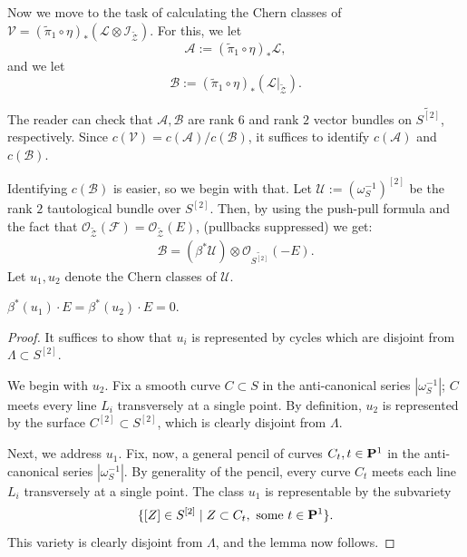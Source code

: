 \documentclass[12pt,reqno]{amsart}
\numberwithin{equation}{section}
\renewcommand{\O}{\mathcal O}
\newcommand{\td}{\widetilde}
\newcommand{\V}{\mathcal V}
\begin{document}
Now we move to the task of calculating the Chern classes of
$\V = (\td{\pi}_{1} \circ \eta)_{*}\left(\mathcal{L} \otimes
  \mathcal{I}_{\td{\mathcal{Z}}}\right)$. For this, we
let \[\mathcal{A} := (\td{\pi}_{1} \circ \eta)_{*}\mathcal{L},\] and
we let \[\mathcal{B} := (\td{\pi}_{1} \circ \eta)_{*} \left(
    \mathcal{L}\big|_{\td{\mathcal{Z}}} \right).\]

The reader can check that $\mathcal{A}, \mathcal{B}$ are rank $6$ and
rank $2$ vector bundles on $\td{S^{[2]}}$, respectively.  Since
$c(\V) = c(\mathcal{A})/c(\mathcal{B})$, it suffices to identify
$c(\mathcal{A})$ and $c(\mathcal{B})$.

Identifying $c(\mathcal{B})$ is easier, so we begin with that. Let
$\mathcal{U} := \left( \omega_{S}^{-1} \right)^{[2]}$ be the rank $2$
tautological bundle over $S^{[2]}$.  Then, by using the push-pull
formula and the fact that
$\O_{\td{\mathcal{Z}}}(\mathcal{F}) = \O_{\td{\mathcal{Z}}}(E)$,
(pullbacks suppressed) we get:
\begin{align}
    \label{eq:B}
    \mathcal{B} = \left(\beta^{*}\mathcal{U} \right) \otimes \O_{\td{S^{[2]}}}(-E).
\end{align}
Let $u_{1}, u_{2}$ denote the Chern classes of $\mathcal{U}$.

\begin{lemma}
  \label{lemma:uE}
  $\beta^{*}(u_{1}) \cdot E = \beta^{*}(u_{2}) \cdot E = 0$.
\end{lemma}

\begin{proof}
  It suffices to show that $u_{i}$ is represented by cycles which are
  disjoint from $\Lambda \subset S^{[2]}$.

  We begin with $u_{2}$.  Fix a smooth curve $C \subset S$ in the
  anti-canonical series $|\omega_{S}^{-1}|$; $C$ meets every line
  $L_{i}$ transversely at a single point.  By definition, $u_{2}$ is
  represented by the surface $C^{[2]} \subset S^{[2]}$, which is
  clearly disjoint from $\Lambda$.

  Next, we address $u_{1}$. Fix, now, a general pencil of curves
  $C_{t}, t\in \P^{1}$ in the anti-canonical series
  $|\omega_{S}^{-1}|$.  By generality of the pencil, every curve
  $C_{t}$ meets each line $L_{i}$ transversely at a single point.  The
  class $u_{1}$ is representable by the subvariety
  \[\{[Z] \in S^{[2]} \mid Z \subset C_{t}, \,\, \textrm{some 
      $t\in \P^{1}$}\}.\] This variety is clearly disjoint from
  $\Lambda$, and the lemma now follows.
\end{proof}
\end{document}
